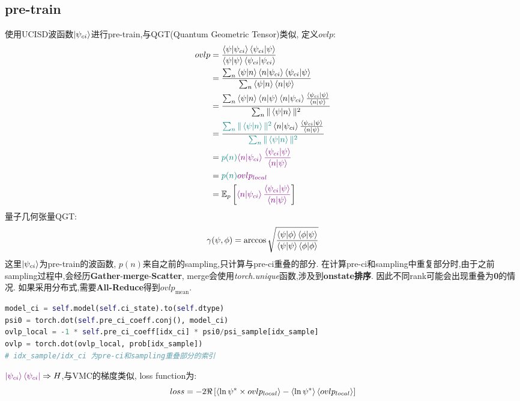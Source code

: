 \subsection{pre-train}

使用UCISD波函数$\ket{\psi_{ci}}$进行pre-train,与QGT(Quantum Geometric Tensor)类似, 定义$ovlp$:
\begin{equation}
    \begin{split}
        ovlp & = \frac{\braket{\psi|\psi_{ci}}{\braket{\psi_{ci}|\psi}}}
        {\braket{\psi|\psi}\braket{\psi_{ci}|\psi_{ci}}} \\
        & = \frac{\sum_n\braket{\psi|n}\braket{n|\psi_{ci}}\braket{\psi_{ci}|\psi}}
        {\sum_n{\braket{\psi|n}\braket{n|\psi}}} \\
        & = \frac{\sum_n\braket{\psi|n}\braket{n|\psi}\braket{n|\psi_{ci}}\frac{\braket{\psi_{ci}|\psi}}{\braket{n|\psi}}}
        {\sum_n \Vert \braket{\psi|n} \Vert^2} \\
        & = \frac{\textcolor{teal}{\sum_n \Vert \braket{\psi|n} \Vert^2} \braket{n|\psi_{ci}}\frac{\braket{\psi_{ci}|\psi}}{\braket{n|\psi}}}
        {\textcolor{teal}{\sum_n \Vert \braket{\psi|n} \Vert^2}} \\
        & = \textcolor{teal}{p(n)}\textcolor{violet}{\braket{n|\psi_{ci}}\frac{\braket{\psi_{ci}|\psi}}{\braket{n|\psi}}} \\
        & = \textcolor{teal}{p(n)}\textcolor{violet}{ovlp_{local}} \\
        & = \mathbb{E}_p\left[ \textcolor{violet}{\braket{n|\psi_{ci}}\frac{\braket{\psi_{ci}|\psi}}{\braket{n|\psi}}} \right] \\
    \end{split}
\end{equation}
量子几何张量QGT:
\begin{equation}
    \gamma(\psi, \phi) = \arccos \sqrt{\frac{\braket{\psi|\phi}\braket{\phi|\psi}}{\braket{\psi|\psi}\braket{\phi|\phi}}}
\end{equation}
这里$\ket{\psi_{ci}}$为pre-train的波函数,
$p(n)$来自之前的sampling,只计算与pre-ci重叠的部分.
在计算pre-ci和sampling中重复部分时,由于之前sampling过程中,会经历\textbf{Gather}-\textbf{merge}-\textbf{Scatter},
merge会使用\textit{torch.unique}函数,涉及到\textbf{onstate排序}.
因此不同rank可能会出现重叠为\textbf{0}的情况.
如果采用分布式,需要\textbf{All-Reduce}得到$ovlp_\mathrm{mean}$.
\begin{lstlisting}[language=Python]
model_ci = self.model(self.ci_state).to(self.dtype)
psi0 = torch.dot(self.pre_ci_coeff.conj(), model_ci)
ovlp_local = -1 * self.pre_ci_coeff[idx_ci] * psi0/psi_sample[idx_sample]
ovlp = torch.dot(ovlp_local, prob[idx_sample])
# idx_sample/idx_ci 为pre-ci和sampling重叠部分的索引
\end{lstlisting}
$\textcolor{violet}{\ket{\psi_{ci}}\bra{\psi_{ci}}}\Rightarrow H $,与VMC的梯度类似, loss function为:
\begin{equation}
    loss = -2\Re\left[\braket{\ln\psi^* \times ovlp_{local} } -\braket{\ln\psi^*}\braket{ovlp_{local}}\right]
\end{equation}

